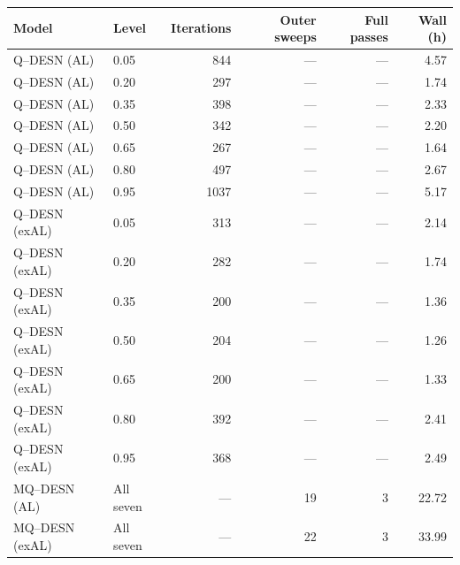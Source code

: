 \begin{tabular}{llrrrr}
\toprule
Model & Level & Iterations & Outer sweeps & Full passes & Wall (h) \\
\midrule
Q--DESN (AL) & 0.05 & 844 & --- & --- & 4.57 \\
Q--DESN (AL) & 0.20 & 297 & --- & --- & 1.74 \\
Q--DESN (AL) & 0.35 & 398 & --- & --- & 2.33 \\
Q--DESN (AL) & 0.50 & 342 & --- & --- & 2.20 \\
Q--DESN (AL) & 0.65 & 267 & --- & --- & 1.64 \\
Q--DESN (AL) & 0.80 & 497 & --- & --- & 2.67 \\
Q--DESN (AL) & 0.95 & 1037 & --- & --- & 5.17 \\
Q--DESN (exAL) & 0.05 & 313 & --- & --- & 2.14 \\
Q--DESN (exAL) & 0.20 & 282 & --- & --- & 1.74 \\
Q--DESN (exAL) & 0.35 & 200 & --- & --- & 1.36 \\
Q--DESN (exAL) & 0.50 & 204 & --- & --- & 1.26 \\
Q--DESN (exAL) & 0.65 & 200 & --- & --- & 1.33 \\
Q--DESN (exAL) & 0.80 & 392 & --- & --- & 2.41 \\
Q--DESN (exAL) & 0.95 & 368 & --- & --- & 2.49 \\
MQ--DESN (AL) & All seven & --- & 19 & 3 & 22.72 \\
MQ--DESN (exAL) & All seven & --- & 22 & 3 & 33.99 \\
\bottomrule
\end{tabular}
